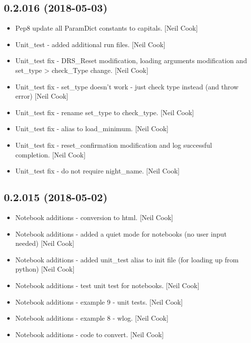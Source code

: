 \documentclass[a4paper,10pt,english]{report}
\begin{document}
\subsection{0.2.016 (2018-05-03)}
\label{\detokenize{misc/changelog:id443}}\begin{itemize}
\item {} 
Pep8 update all ParamDict constants to capitals. {[}Neil Cook{]}

\item {} 
Unit\_test - added additional run files. {[}Neil Cook{]}

\item {} 
Unit\_test fix - DRS\_Reset modification, loading arguments modification
and set\_type \textendash{}\textgreater{} check\_Type change. {[}Neil Cook{]}

\item {} 
Unit\_test fix - set\_type doesn’t work - just check type instead (and
throw error) {[}Neil Cook{]}

\item {} 
Unit\_test fix - rename set\_type to check\_type. {[}Neil Cook{]}

\item {} 
Unit\_test fix - alias to load\_minimum. {[}Neil Cook{]}

\item {} 
Unit\_test fix - reset\_confirmation modification and log successful
completion. {[}Neil Cook{]}

\item {} 
Unit\_test fix - do not require night\_name. {[}Neil Cook{]}

\end{itemize}


\subsection{0.2.015 (2018-05-02)}
\label{\detokenize{misc/changelog:id444}}\begin{itemize}
\item {} 
Notebook additions - conversion to html. {[}Neil Cook{]}

\item {} 
Notebook additions - added a quiet mode for notebooks (no user input
needed) {[}Neil Cook{]}

\item {} 
Notebook additions - added unit\_test alias to init file (for loading
up from python) {[}Neil Cook{]}

\item {} 
Notebook additions - test unit test for notebooks. {[}Neil Cook{]}

\item {} 
Notebook additions - example 9 - unit tests. {[}Neil Cook{]}

\item {} 
Notebook additions - example 8 - wlog. {[}Neil Cook{]}

\item {} 
Notebook additions - code to convert. {[}Neil Cook{]}

\end{itemize}
\end{document}
